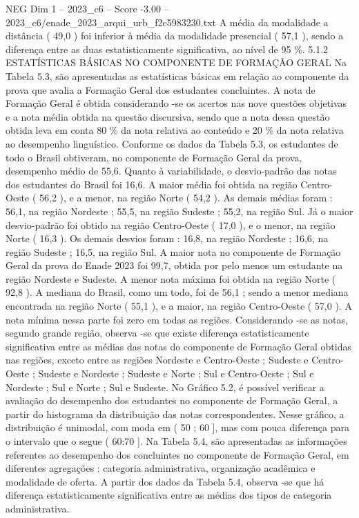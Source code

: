 \begin{textsample}{NEG Dim 1 – 2023\_c6 – Score -3.00 – 2023\_c6/enade\_2023\_arqui\_urb\_f2c5983230.txt}
A média da modalidade a distância ( 49,0 ) foi inferior à média da modalidade presencial ( 57,1 ), sendo a diferença entre as duas estatisticamente significativa, ao nível de 95 \%. 5.1.2 ESTATÍSTICAS BÁSICAS NO COMPONENTE DE FORMAÇÃO GERAL Na Tabela 5.3, são apresentadas as estatísticas básicas em relação ao componente da prova que avalia a Formação Geral dos estudantes concluintes.
A nota de Formação Geral é obtida considerando -se os acertos nas nove questões objetivas e a nota média obtida na questão discursiva, sendo que a nota dessa questão obtida leva em conta 80 \% da nota relativa ao conteúdo e 20 \% da nota relativa ao desempenho linguístico.
Conforme os dados da Tabela 5.3, os estudantes de todo o Brasil obtiveram, no componente de Formação Geral da prova, desempenho médio de 55,6.
Quanto à variabilidade, o desvio-padrão das notas dos estudantes do Brasil foi 16,6.
A maior média foi obtida na região Centro-Oeste ( 56,2 ), e a menor, na região Norte ( 54,2 ).
As demais médias foram : 56,1, na região Nordeste ; 55,5, na região Sudeste ; 55,2, na região Sul.
Já o maior desvio-padrão foi obtido na região Centro-Oeste ( 17,0 ), e o menor, na região Norte ( 16,3 ).
Os demais desvios foram : 16,8, na região Nordeste ; 16,6, na região Sudeste ; 16,5, na região Sul.
A maior nota no componente de Formação Geral da prova do Enade 2023 foi 99,7, obtida por pelo menos um estudante na região Nordeste e Sudeste.
A menor nota máxima foi obtida na região Norte ( 92,8 ).
A mediana do Brasil, como um todo, foi de 56,1 ; sendo a menor mediana encontrada na região Norte ( 55,1 ), e a maior, na região Centro-Oeste ( 57,0 ).
A nota mínima nessa parte foi zero em todas as regiões.
Considerando -se as notas, segundo grande região, observa -se que existe diferença estatisticamente significativa entre as médias das notas do componente de Formação Geral obtidas nas regiões, exceto entre as regiões Nordeste e Centro-Oeste ; Sudeste e Centro-Oeste ; Sudeste e Nordeste ; Sudeste e Norte ; Sul e Centro-Oeste ; Sul e Nordeste ; Sul e Norte ; Sul e Sudeste.
No Gráfico 5.2, é possível verificar a avaliação do desempenho dos estudantes no componente de Formação Geral, a partir do histograma da distribuição das notas correspondentes.
Nesse gráfico, a distribuição é unimodal, com moda em ( 50 ; 60 ], mas com pouca diferença para o intervalo que o segue ( 60:70 ].
Na Tabela 5.4, são apresentadas as informações referentes ao desempenho dos concluintes no componente de Formação Geral, em diferentes agregações : categoria administrativa, organização acadêmica e modalidade de oferta.
A partir dos dados da Tabela 5.4, observa -se que há diferença estatisticamente significativa entre as médias dos tipos de categoria administrativa.

\end{textsample}

